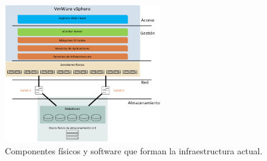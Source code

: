 \begin{figure}[hp]
    \centering
    \includegraphics[width=0.6\textwidth]{imaxes/cap2recursos/recursosReal.png}
    \caption{Componentes físicos y software que forman la infraestructura actual.}
    \label{fig:infrastructure-components-production}
\end{figure}
\FloatBarrier

